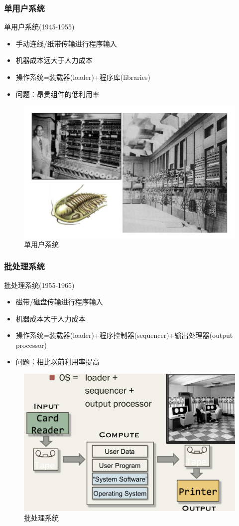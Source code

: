 \documentclass[UTF8]{ctexbeamer}
\begin{document}
\begin{frame}

\frametitle{单用户系统}

单用户系统(1945-1955)
\begin{itemize}
\item 手动连线/纸带传输进行程序输入
\item 机器成本远大于人力成本	
\item 操作系统=装载器(loader)+程序库(libraries)
\item 问题：昂贵组件的低利用率
\end{itemize}

	\begin{figure}
	\centering
	\includegraphics[width=0.6\linewidth]{history-single-user-system}
	\caption{单用户系统}
\end{figure}

\end{frame}



\begin{frame}
	
	\frametitle{批处理系统}
	
	批处理系统(1955-1965)
	\begin{itemize}
		\item 磁带/磁盘传输进行程序输入
		\item 机器成本大于人力成本	
		\item 操作系统=装载器(loader)+程序控制器(sequencer)+输出处理器(output processor)
		\item 问题：相比以前利用率提高
	\end{itemize}
	
	\begin{figure}
		\centering
		\includegraphics[width=0.6\linewidth]{history-batch-processing}
		\caption{批处理系统}
	\end{figure}
	
\end{frame}
\end{document}
